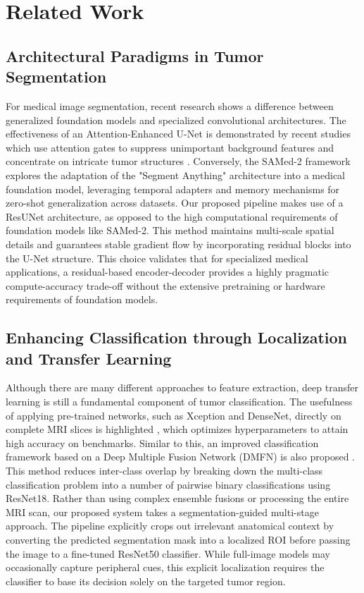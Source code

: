 
\section{Related Work}

\subsection{Architectural Paradigms in Tumor Segmentation 
}For medical image segmentation, recent research shows a difference between generalized foundation models and specialized convolutional architectures. The effectiveness of an Attention-Enhanced U-Net is demonstrated by recent studies which use attention gates to suppress unimportant background features and concentrate on intricate tumor structures \cite{Islam2026}. Conversely, the SAMed-2 framework \cite{Yan2025} explores the adaptation of the "Segment Anything" architecture into a medical foundation model, leveraging temporal adapters and memory mechanisms for zero-shot generalization across datasets. Our proposed pipeline makes use of a ResUNet architecture, as opposed to the high computational requirements of foundation models like SAMed-2. This method maintains multi-scale spatial details and guarantees stable gradient flow by incorporating residual blocks into the U-Net structure. This choice validates that for specialized medical applications, a residual-based encoder-decoder provides a highly pragmatic compute-accuracy trade-off without the extensive pretraining or hardware requirements of foundation models. 

\subsection{Enhancing Classification through Localization and Transfer Learning }
Although there are many different approaches to feature extraction, deep transfer learning is still a fundamental component of tumor classification. The usefulness of applying pre-trained networks, such as Xception and DenseNet, directly on complete MRI slices is highlighted \cite{Asif2022}, which optimizes hyperparameters to attain high accuracy on benchmarks. Similar to this, an improved classification framework based on a Deep Multiple Fusion Network (DMFN) is also proposed \cite{Vure2025}. This method reduces inter-class overlap by breaking down the multi-class classification problem into a number of pairwise binary classifications using ResNet18. Rather than using complex ensemble fusions or processing the entire MRI scan, our proposed system takes a segmentation-guided multi-stage approach. The pipeline explicitly crops out irrelevant anatomical context by converting the predicted segmentation mask into a localized ROI before passing the image to a fine-tuned ResNet50 classifier. While full-image models may occasionally capture peripheral cues, this explicit localization requires the classifier to base its decision solely on the targeted tumor region. 

